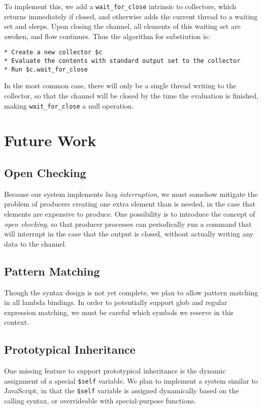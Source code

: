\documentclass[english,PRO]{ipsj}
\begin{document}
To implement this, we add a \verb/wait_for_close/ intrinsic to collectors, which returns immediately if closed, and otherwise adds the current thread to a waiting set and sleeps. Upon closing the channel, all elements of this waiting set are awoken, and flow continues. Thus the algorithm for substiution is:
\begin{lstlisting}
* Create a new collector $c
* Evaluate the contents with standard output set to the collector
* Run $c.wait_for_close
\end{lstlisting}

\noindent
In the most common case, there will only be a single thread writing to the collector, so that the channel will be closed by the time the evaluation is finished, making \verb/wait_for_close/ a null operation.

\section{Future Work}\label{future-work}

\subsection{Open Checking}\noindent
Because our system implements \emph{lazy interruption}, we must somehow mitigate the problem of producers creating one extra element than is needed, in the case that elements are expensive to produce. One possibility is to introduce the concept of \emph{open checking}, so that producer processes can periodically run a command that will interrupt in the case that the output is closed, without actually writing any data to the channel.

\subsection{Pattern Matching}\noindent
Though the syntax design is not yet complete, we plan to allow pattern matching in all lambda bindings. In order to potentially support glob and regular expression matching, we must be careful which symbols we reserve in this context.

\subsection{Prototypical Inheritance}\noindent
One missing feature to support prototypical inheritance is the dynamic assignment of a special \verb/$self/ variable. We plan to implement a system similar to JavaScript, in that the \verb/$self/ variable is assigned dynamically based on the calling syntax, or overrideable with special-purpose functions.
\end{document}
